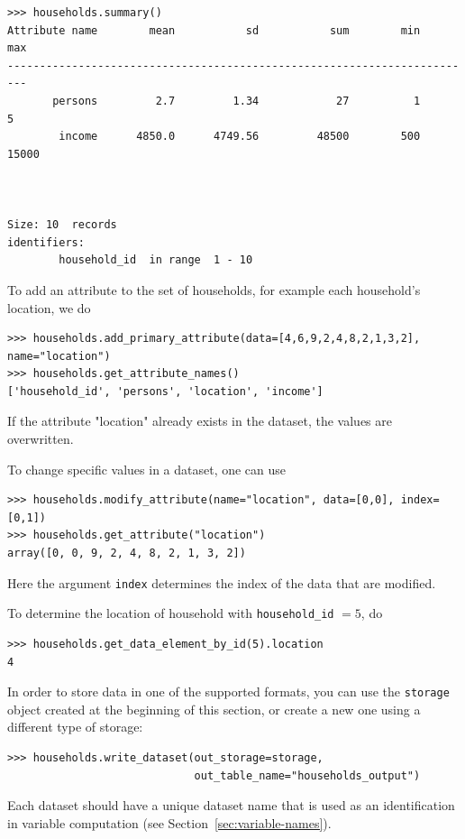 \attributesindex
\begin{verbatim}
>>> households.summary()
Attribute name        mean           sd           sum        min     max
-------------------------------------------------------------------------
       persons         2.7         1.34            27          1       5
        income      4850.0      4749.56         48500        500   15000
       


Size: 10  records
identifiers:
        household_id  in range  1 - 10
\end{verbatim}

To add an attribute \attributesindex to the set of households, for example each
household's location, we do
\begin{verbatim}
>>> households.add_primary_attribute(data=[4,6,9,2,4,8,2,1,3,2], name="location")
>>> households.get_attribute_names()
['household_id', 'persons', 'location', 'income']
\end{verbatim}
If the attribute \attributesindex "location" already exists in the dataset, \datasetindex the values are
overwritten.

To change specific values in a dataset, \datasetindex one can use

\attributesindex
\begin{verbatim}
>>> households.modify_attribute(name="location", data=[0,0], index=[0,1])
>>> households.get_attribute("location")
array([0, 0, 9, 2, 4, 8, 2, 1, 3, 2])
\end{verbatim}
Here the argument \verb|index| determines the index of the data that are
modified.

To determine the location of household with \verb|household_id| $= 5$,
do
\begin{verbatim}
>>> households.get_data_element_by_id(5).location
4
\end{verbatim}

In order to store data in one of the supported formats,
you can use the {\tt storage} object created at the beginning of this section, or create a new one using
a different type of storage:

\datasetindex
\begin{verbatim}
>>> households.write_dataset(out_storage=storage,
                             out_table_name="households_output")
\end{verbatim}

Each dataset \datasetindex
  should have a unique dataset \datasetindex name that is used as an identification in
  variable \variablesindex computation (see
  Section~\ref{sec:variable-names}). 

